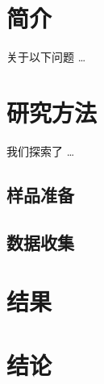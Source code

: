 \documentclass{article}
\begin{document}
\section{简介}

关于以下问题 \ldots

\section{研究方法}

我们探索了 \ldots

\subsection{样品准备}

\subsection{数据收集}

\section{结果}

\section{结论}
\end{document}

